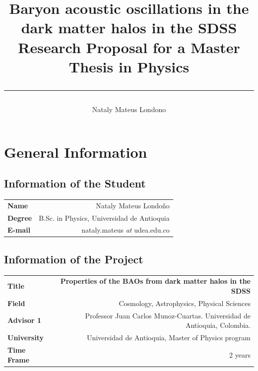 \documentclass[a4,useAMS,usegraphicx,12pt]{article}
\title{ {\textbf{Baryon acoustic oscillations in the dark matter halos in the SDSS}}\\ 
				\Large Research Proposal for a Master Thesis in Physics\\ 
				\color{black}\rule{15cm}{0.5mm} }
\author{Nataly Mateus Londono}
\date{}
\begin{document}
  
\maketitle

\hypersetup{
  citebordercolor=white,
  filebordercolor=white,
  linkbordercolor=white
}

\tableofcontents
 
\newpage 

\section{General Information}
\small
\subsection*{Information of the Student}
\begin{tabular}{L!{\VRule}R}
\bf Name		& Nataly Mateus Londoño\\
\bf Degree		& B.Sc. in Physics, Universidad de Antioquia \\
\bf E-mail	&  nataly.mateus \textit{at} udea.edu.co \\
\end{tabular}


\vspace{15pt}  
	
\subsection*{Information of the Project}
\begin{tabular}{L!{\VRule}R}
\bf Title		& \bf Properties of the BAOs from dark matter halos in the SDSS \\
\bf Field		& Cosmology, Astrophysics, Physical Sciences \\
\bf Advisor 1	& Professor Juan Carlos Munoz-Cuartas. Universidad de Antioquia, Colombia.\\
\bf University	& Universidad de Antioquia, Master of Physics program \\
\bf Time Frame	& 2 years \\
\end{tabular}
\normalsize
\end{document}
